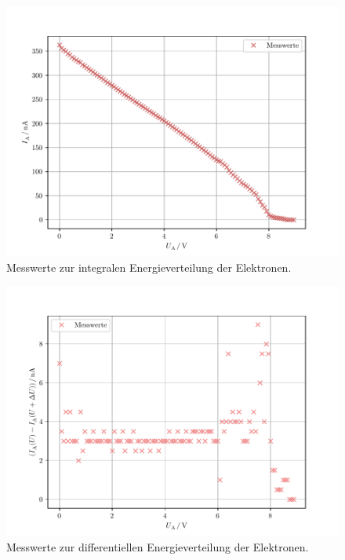 \begin{figure}
    \centering
    \includegraphics[width=\textwidth]{plots/Energie.pdf}
    \caption{Messwerte zur integralen Energieverteilung der Elektronen.}
    \label{fig:EnergieMess}
\end{figure}
\begin{figure}
    \centering
    \includegraphics[width=\textwidth]{plots/EnergieDiff.pdf}
    \caption{Messwerte zur differentiellen Energieverteilung der Elektronen.}
    \label{fig:EnergieMess2}
\end{figure}